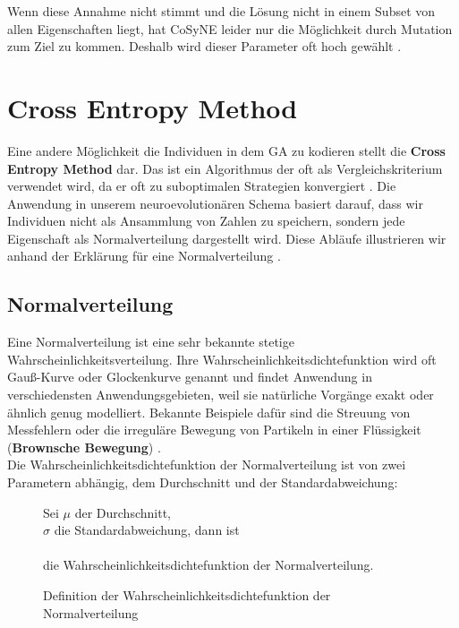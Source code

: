             \noindent
            Wenn diese Annahme nicht stimmt und die Lösung nicht in einem Subset von allen Eigenschaften liegt, hat CoSyNE leider nur die Möglichkeit durch Mutation zum Ziel zu kommen. Deshalb wird dieser Parameter oft hoch gewählt \cite{cosyne1}\cite{cosyne2}\cite{cosyne3}.



\newpage
    \section{Cross Entropy Method} \label{cross-entropy-definition}
        Eine andere Möglichkeit die Individuen in dem GA zu kodieren stellt die \textbf{Cross Entropy Method} dar. Das ist ein Algorithmus der oft als Vergleichskriterium verwendet wird, da er oft zu suboptimalen Strategien konvergiert \cite{cem}. Die Anwendung in unserem neuroevolutionären Schema basiert darauf, dass wir Individuen nicht als Ansammlung von Zahlen zu speichern, sondern jede Eigenschaft als Normalverteilung dargestellt wird. Diese Abläufe illustrieren wir anhand der Erklärung für eine Normalverteilung \cite{ml-script}.

        \subsection{Normalverteilung}

            Eine Normalverteilung ist eine sehr bekannte stetige Wahrscheinlichkeitsverteilung. Ihre Wahrscheinlichkeitsdichtefunktion wird oft Gauß-Kurve oder Glockenkurve genannt und findet Anwendung in verschiedensten Anwendungsgebieten, weil sie natürliche Vorgänge exakt oder ähnlich genug modelliert. Bekannte Beispiele dafür sind die Streuung von Messfehlern oder die irreguläre Bewegung von Partikeln in einer Flüssigkeit (\textbf{Brownsche Bewegung}) \cite{Hida1980}.\\[2mm]
            \noindent
            Die Wahrscheinlichkeitsdichtefunktion der Normalverteilung ist von zwei Parametern abhängig, dem Durchschnitt und der Standardabweichung:
            \begin{figure}[H]
                \begin{mdframed}
                    \noindent
                    Sei $\mu$ der Durchschnitt,\\
                    \hspace*{4.5mm}    $\sigma$ die Standardabweichung, dann ist\\[4mm]
                    \hspace*{50mm}  \\[4mm]
                    \hspace*{4.5mm} die Wahrscheinlichkeitsdichtefunktion der Normalverteilung.
                \end{mdframed}
                \formforfigure
                \caption{\label{norm-dist-pdf-formel} Definition der Wahrscheinlichkeitsdichtefunktion der Normalverteilung}
            \end{figure}

